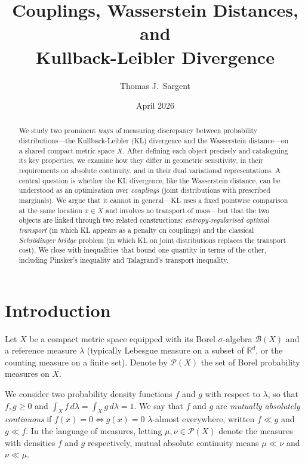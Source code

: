 \documentclass[12pt]{article}
\title{Couplings, Wasserstein Distances, and\\
       Kullback-Leibler Divergence}
\author{Thomas J.\ Sargent}
\date{April 2026}
\newcommand{\calP}{\mathcal{P}}
\newcommand{\R}{\mathbb{R}}
\begin{document}
\maketitle

\begin{abstract}
We study two prominent ways of measuring discrepancy between probability
distributions---the Kullback-Leibler (KL) divergence and the Wasserstein
distance---on a shared compact metric space $X$.  After defining each
object precisely and cataloguing its key properties, we examine how they
differ in geometric sensitivity, in their requirements on absolute
continuity, and in their dual variational representations.  A central
question is whether the KL divergence, like the Wasserstein distance,
can be understood as an optimisation over \emph{couplings} (joint
distributions with prescribed marginals).  We argue that it cannot in
general---KL uses a fixed pointwise comparison at the same location
$x \in X$ and involves no transport of mass---but that the two objects
are linked through two related constructions:
\emph{entropy-regularised optimal transport} (in which KL appears as
a penalty on couplings) and the classical \emph{Schr\"odinger bridge}
problem (in which KL on joint distributions replaces the transport cost).
We close with inequalities that bound one quantity in terms of the other,
including Pinsker's inequality and Talagrand's transport inequality.
\end{abstract}

\tableofcontents
\newpage

\section{Introduction}

Let $X$ be a compact metric space equipped with its Borel
$\sigma$-algebra $\mathcal{B}(X)$ and a reference measure
$\lambda$ (typically Lebesgue measure on a subset of $\R^d$,
or the counting measure on a finite set).  Denote by
$\calP(X)$ the set of Borel probability measures on $X$.

We consider two probability density functions $f$ and $g$ with
respect to $\lambda$, so that $f, g \geq 0$ and
$\int_X f\,d\lambda = \int_X g\,d\lambda = 1$.  We say that
$f$ and $g$ are \emph{mutually absolutely continuous} if
$f(x) = 0 \Leftrightarrow g(x) = 0$ $\lambda$-almost
everywhere, written $f \ll g$ and $g \ll f$.  In the language
of measures, letting $\mu, \nu \in \calP(X)$ denote the
measures with densities $f$ and $g$ respectively, mutual
absolute continuity means $\mu \ll \nu$ and $\nu \ll \mu$.
\end{document}
